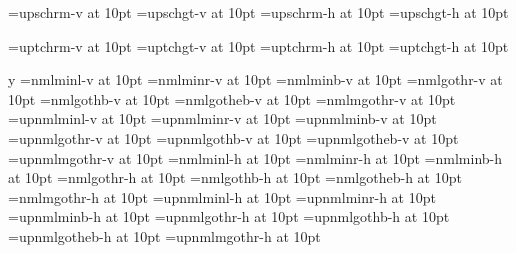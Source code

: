\ifx\MAPSETSC\undefined\else\ifx\ucs\undefined\else
  \shipout\vbox{\DIR\ADJUST
    \iftdir
      \tfont\x=upschrm-v at 10pt\x\TESTSC
      \tfont\x=upschgt-v at 10pt\x\TESTSC
    \else
      \jfont\x=upschrm-h at 10pt\x\TESTSC
      \jfont\x=upschgt-h at 10pt\x\TESTSC
    \fi
  }\fi
\fi

\ifx\MAPSETTC\undefined\else\ifx\ucs\undefined\else
  \shipout\vbox{\DIR\ADJUST
    \iftdir
      \tfont\x=uptchrm-v at 10pt\x\TESTTC
      \tfont\x=uptchgt-v at 10pt\x\TESTTC
    \else
      \jfont\x=uptchrm-h at 10pt\x\TESTTC
      \jfont\x=uptchgt-h at 10pt\x\TESTTC
    \fi
  }\fi
\fi

\if y\USEOTF
\ifx\MAPSETJP\undefined\else\shipout\vbox{\DIR\ADJUST
  \iftdir
    \ifx\ucs\undefined
      \tfont\x=nmlminl-v at 10pt\x\TESTJP
      \tfont\x=nmlminr-v at 10pt\x\TESTJP
      \tfont\x=nmlminb-v at 10pt\x\TESTJP
      \tfont\x=nmlgothr-v at 10pt\x\TESTJP
      \tfont\x=nmlgothb-v at 10pt\x\TESTJP
      \tfont\x=nmlgotheb-v at 10pt\x\TESTJP
      \tfont\x=nmlmgothr-v at 10pt\x\TESTJP
    \else
      \tfont\x=upnmlminl-v at 10pt\x\TESTJP
      \tfont\x=upnmlminr-v at 10pt\x\TESTJP
      \tfont\x=upnmlminb-v at 10pt\x\TESTJP
      \tfont\x=upnmlgothr-v at 10pt\x\TESTJP
      \tfont\x=upnmlgothb-v at 10pt\x\TESTJP
      \tfont\x=upnmlgotheb-v at 10pt\x\TESTJP
      \tfont\x=upnmlmgothr-v at 10pt\x\TESTJP
    \fi
  \else
    \ifx\ucs\undefined
      \tfont\x=nmlminl-h at 10pt\x\TESTJP
      \tfont\x=nmlminr-h at 10pt\x\TESTJP
      \tfont\x=nmlminb-h at 10pt\x\TESTJP
      \tfont\x=nmlgothr-h at 10pt\x\TESTJP
      \tfont\x=nmlgothb-h at 10pt\x\TESTJP
      \tfont\x=nmlgotheb-h at 10pt\x\TESTJP
      \tfont\x=nmlmgothr-h at 10pt\x\TESTJP
    \else
      \tfont\x=upnmlminl-h at 10pt\x\TESTJP
      \tfont\x=upnmlminr-h at 10pt\x\TESTJP
      \tfont\x=upnmlminb-h at 10pt\x\TESTJP
      \tfont\x=upnmlgothr-h at 10pt\x\TESTJP
      \tfont\x=upnmlgothb-h at 10pt\x\TESTJP
      \tfont\x=upnmlgotheb-h at 10pt\x\TESTJP
      \tfont\x=upnmlmgothr-h at 10pt\x\TESTJP
    \fi
  \fi
}\fi
\fi

